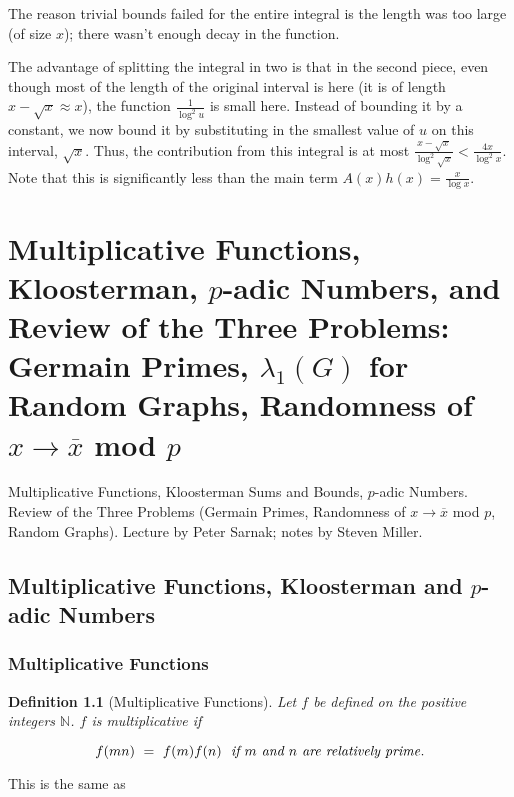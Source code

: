 \documentclass[12pt,letterpaper]{report}
\newcommand\be{\begin{equation}}
\newcommand\ee{\end{equation}}
\newcommand{\N}{\mathbb{N}}
\newtheorem{defi}[thm]{Definition}
\begin{document}
The reason trivial bounds failed for the entire integral is the
length was too large (of size $x$); there wasn't enough decay in
the function.

The advantage of splitting the integral in two is that in the
second piece, even though most of the length of the original
interval is here (it is of length $x - \sqrt{x} \approx x$), the
function $\frac{1}{\log^2 u}$ is small here. Instead of bounding
it by a constant, we now bound it by substituting in the smallest
value of $u$ on this interval, $\sqrt{x}$. Thus, the contribution
from this integral is at most $\frac{x - \sqrt{x}}{\log^2
\sqrt{x}} < \frac{4x}{\log^2 x}$. Note that this is significantly
less than the main term $A(x)h(x) = \frac{x}{\log x}$.




\chapter{Multiplicative Functions, Kloosterman, $p$-adic Numbers,
and Review of the Three Problems: Germain Primes, $\lambda_1(G)$
for Random Graphs, Randomness of $x \to \overline{x}$ mod $p$}

Multiplicative Functions, Kloosterman Sums and Bounds, $p$-adic
Numbers. Review of the Three Problems (Germain Primes, Randomness
of $x \to \overline{x}$ mod $p$, Random Graphs). Lecture by Peter
Sarnak; notes by Steven Miller.


\section{Multiplicative Functions, Kloosterman and $p$-adic
Numbers}

\subsection{Multiplicative Functions}

\begin{defi}[Multiplicative Functions] Let $f$ be defined on the
positive integers $\N$. $f$ is multiplicative if

\be f(mn) \ = \ f(m) f(n) \ \ \text{\emph{if $m$ and $n$ are
relatively prime}}. \ee
\end{defi}

This is the same as
\end{document}
